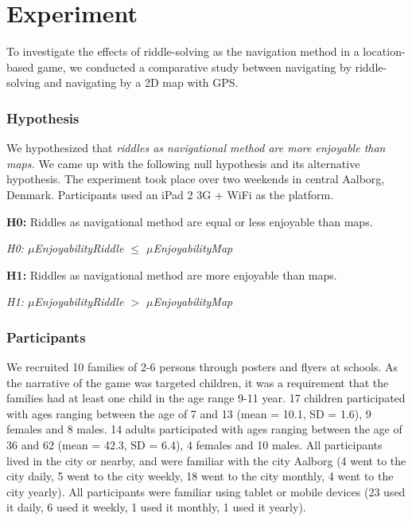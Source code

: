 \section{Experiment}

To investigate the effects of riddle-solving as the navigation method in a location-based game, we conducted a comparative study between navigating by riddle-solving and navigating by a 2D map with GPS. 

\subsubsection{Hypothesis}

We hypothesized that \textit{riddles as navigational method are more enjoyable than maps.} We came up with the following null hypothesis and its alternative hypothesis. The experiment took place over two weekends in central Aalborg, Denmark. Participants used an iPad 2 3G + WiFi as the platform.

\textbf{H0:} Riddles as navigational method are equal or less enjoyable than maps. 

\hspace{10 mm} \textit{H0: $\mu$EnjoyabilityRiddle $\leq$ $\mu$EnjoyabilityMap}

\textbf{H1:} Riddles as navigational method are more enjoyable than maps.

\hspace{10 mm} \textit{H1: $\mu$EnjoyabilityRiddle $>$ $\mu$EnjoyabilityMap}

\subsubsection{Participants}
We recruited 10 families of 2-6 persons through posters and flyers at schools. 
As the narrative of the game was targeted children, it was a requirement that the families had at least one child in the age range 9-11 year. 17 children participated with ages ranging between the age of 7 and 13 (mean = 10.1, SD = 1.6), 9 females and 8 males. 14 adults participated with ages ranging between the age of 36 and 62 (mean = 42.3, SD = 6.4), 4 females and 10 males.  All participants lived in the city or nearby, and were familiar with the city Aalborg (4 went to the city daily, 5 went to the city weekly, 18 went to the city monthly, 4 went to the city yearly). All participants were familiar using tablet or mobile devices (23 used it daily, 6 used it weekly, 1 used it monthly, 1 used it yearly).


